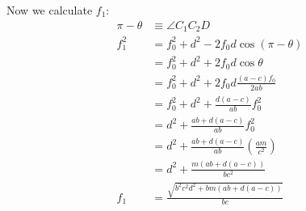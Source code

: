 \documentclass[11pt]{article}
\begin{document}
Now we calculate $f_1$:
\begin{align}
\pi - \theta &\equiv \angle{C_1C_2D}\\
f_1^2 &= f_0^2 + d^2 - 2f_0d\cos(\pi-\theta)\nonumber\\
 &= f_0^2 + d^2 + 2f_0d\cos\theta\nonumber\\
 &= f_0^2 + d^2 + 2f_0d\frac{(a-c)f_0}{2ab}\nonumber\\
 &= f_0^2 + d^2 + \frac{d(a-c)}{ab}f_0^2\nonumber\\
 &= d^2 + \frac{ab + d(a-c)}{ab}f_0^2\nonumber\\
 &= d^2 + \frac{ab + d(a-c)}{ab}\left(\frac{am}{c^2}\right)\nonumber\\
 &= d^2 + \frac{m(ab + d(a-c))}{bc^2}\nonumber\\
f_1 &= \frac{\sqrt{b^2c^2d^2 + bm(ab + d(a-c))}}{bc}
\end{align}
\end{document}
